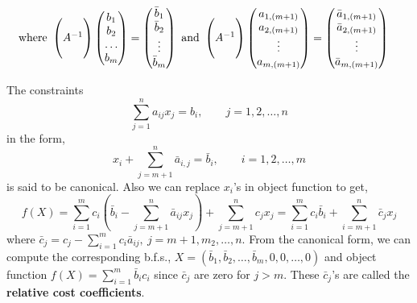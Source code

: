 \begin{commentary}
\begin{align*}
		\text{where } & \begin{pmatrix} \\ A^{-1} \\ \hphantom{} \end{pmatrix} \begin{pmatrix} b_1 \\ b_2 \\ \dots \\ b_m \end{pmatrix} = \begin{pmatrix} \bar{b}_1 \\ \bar{b}_2 \\ \vdots \\ \bar{b}_m \end{pmatrix} \text{ and } \begin{pmatrix} \\ A^{-1} \\ \hphantom{} \end{pmatrix} \begin{pmatrix} a_{1,(m+1)} \\ a_{2,(m+1)} \\ \vdots \\ a_{m,(m+1)} \end{pmatrix} = \begin{pmatrix} \bar{a}_{1,(m+1)} \\ \bar{a}_{2,(m+1)} \\ \vdots \\ \bar{a}_{m,(m+1)} \end{pmatrix}
\end{align*}

The constraints \[ \sum_{j=1}^n a_{ij}x_j = b_i, \qquad j = 1,2,\dots,n \] in the form, \[ x_i + \sum_{j=m+1}^n \bar{a}_{i,j} = \bar{b}_i, \qquad i=1,2,\dots,m\] is said to be canonical.
Also we can replace $x_i$'s in object function to get, 
\[ f(X) = \sum_{i=1}^m c_i \left( \bar{b}_i - \sum_{j=m+1}^n \bar{a}_{ij}x_j \right) + \sum_{j=m+1}^n c_jx_j = \sum_{i=1}^m c_i\bar{b}_i + \sum_{i=m+1}^n \bar{c}_jx_j \]
where $\displaystyle \bar{c}_j = c_j - \sum_{i=1}^m c_i \bar{a}_{ij},\ j = m+1,m_2,\dots,n$.
 From the canonical form, we can compute the corresponding b.f.s., $X = (\bar{b}_1,\bar{b}_2,\dots,\bar{b}_m,0,0,\dots,0)$ and object function $\displaystyle f(X) = \sum_{i=1}^m \bar{b}_ic_i $ since $\bar{c}_j$ are zero for $j > m$. These $\bar{c}_j$'s are called the \textbf{relative cost coefficients}.
\end{commentary}


